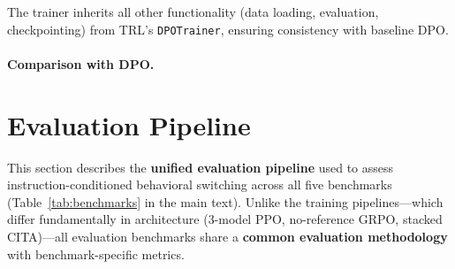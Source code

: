 The trainer inherits all other functionality (data loading, evaluation, checkpointing) from TRL's \texttt{DPOTrainer}, ensuring consistency with baseline DPO.

\paragraph{Comparison with DPO.}
\begin{table}[ht!]
\centering
{}
\caption{Key differences between the DPO and CITA training pipelines.}
\label{tab:dpo_vs_cita_comparison}
\end{table}

\section{Evaluation Pipeline}
\label{sec:appendix_evaluation_pipeline}

This section describes the \textbf{unified evaluation pipeline} used to assess instruction-conditioned behavioral switching across all five benchmarks (Table~\ref{tab:benchmarks} in the main text). Unlike the training pipelines---which differ fundamentally in architecture (3-model PPO, no-reference GRPO, stacked CITA)---all evaluation benchmarks share a \textbf{common evaluation methodology} with benchmark-specific metrics.

